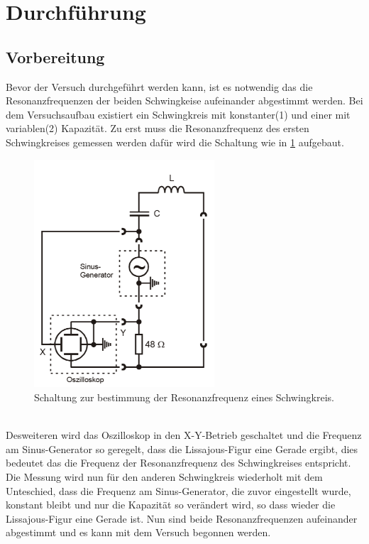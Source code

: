 \section{Durchführung}
\label{sec:Durchführung}
 \subsection{Vorbereitung}
  \label{subsec:Vorbereitung}
Bevor der Versuch durchgeführt werden kann,
ist es notwendig das die Resonanzfrequenzen der
beiden Schwingkeise aufeinander abgestimmt werden.
Bei dem Versuchsaufbau existiert ein Schwingkreis
mit konstanter(1) und einer mit variablen(2) Kapazität.
Zu erst muss die Resonanzfrequenz des ersten
Schwingkreises gemessen werden dafür wird die Schaltung
wie in \ref{abb:messungresonanz} aufgebaut.
\begin{figure}[h]
     \centering
     \includegraphics[width=0.6\textwidth]{resonanzbestimmung.PNG}
     \caption{Schaltung zur bestimmung der
     Resonanzfrequenz eines Schwingkreis.\cite{skript} }
     \label{abb:messungresonanz}
\end{figure}\\
Desweiteren wird das Oszilloskop in den X-Y-Betrieb geschaltet und
die Frequenz am Sinus-Generator so geregelt, dass die Lissajous-Figur
eine Gerade ergibt, dies bedeutet das die Frequenz der Resonanzfrequenz des
Schwingkreises entspricht. Die Messung wird nun für den anderen Schwingkreis wiederholt
mit dem Unteschied, dass die Frequenz am Sinus-Generator, die zuvor eingestellt wurde,
konstant bleibt und nur die Kapazität so verändert wird, so dass wieder die Lissajous-Figur
eine Gerade ist. Nun sind beide Resonanzfrequenzen aufeinander abgestimmt und es kann mit
dem Versuch begonnen werden.
